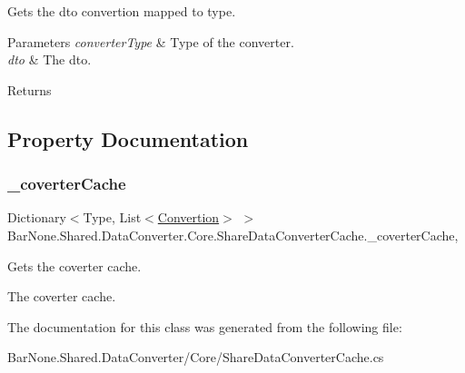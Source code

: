 Gets the dto convertion mapped to type. 


\begin{DoxyParams}{Parameters}
{\em converter\+Type} & Type of the converter.\\
\hline
{\em dto} & The dto.\\
\hline
\end{DoxyParams}
\begin{DoxyReturn}{Returns}

\end{DoxyReturn}


\subsection{Property Documentation}
\mbox{\label{class_bar_none_1_1_shared_1_1_data_converter_1_1_core_1_1_share_data_converter_cache_a95827a6cad635e009450d52cd4f8623d}} 
\subsubsection{\texorpdfstring{\+\_\+coverter\+Cache}{\_coverterCache}}
{\footnotesize\ttfamily Dictionary$<$Type, List$<$\mbox{\hyperlink{struct_bar_none_1_1_shared_1_1_data_converter_1_1_core_1_1_convertion}{Convertion}}$>$ $>$ Bar\+None.\+Shared.\+Data\+Converter.\+Core.\+Share\+Data\+Converter\+Cache.\+\_\+coverter\+Cache\hspace{0.3cm}{\ttfamily [get]}, {}}



Gets the coverter cache. 

The coverter cache. 

The documentation for this class was generated from the following file\+:\begin{DoxyCompactItemize}
\item 
Bar\+None.\+Shared.\+Data\+Converter/\+Core/Share\+Data\+Converter\+Cache.\+cs\end{DoxyCompactItemize}
